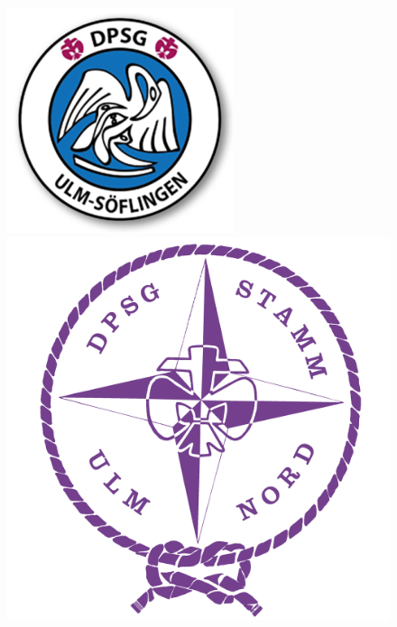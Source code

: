 \begin{titlepage}
    \begin{center}
        \begin{figure}[h!]
            \centering
            \begin{minipage}{.2\linewidth}
                \centering
                \includegraphics[width=\textwidth]{../img/dpsg_ulm-soeflingen.png}
            \end{minipage}%
            \begin{minipage}{.2\linewidth}
                \centering
                \vspace{12pt}
                \includegraphics[width=\textwidth]{../img/dpsg_ulm-nord.png}

\end{minipage}
\end{figure}
\end{center}
\end{titlepage}
